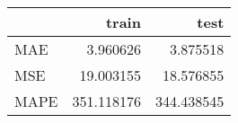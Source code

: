 \begin{tabular}{lrr}
\toprule
{} &       train &        test \\
\midrule
MAE  &    3.960626 &    3.875518 \\
MSE  &   19.003155 &   18.576855 \\
MAPE &  351.118176 &  344.438545 \\
\bottomrule
\end{tabular}
